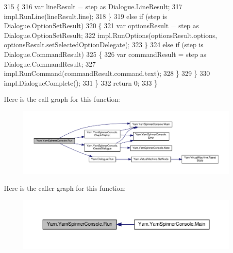 \begin{DoxyCode}
315                     \{
316                         var lineResult = step as Dialogue.LineResult;
317                         impl.RunLine(lineResult.line);
318                     \}
319                     \textcolor{keywordflow}{else} \textcolor{keywordflow}{if} (step is Dialogue.OptionSetResult)
320                     \{
321                         var optionsResult = step as Dialogue.OptionSetResult;
322                         impl.RunOptions(optionsResult.options, optionsResult.setSelectedOptionDelegate);
323                     \}
324                     \textcolor{keywordflow}{else} \textcolor{keywordflow}{if} (step is Dialogue.CommandResult)
325                     \{
326                         var commandResult = step as Dialogue.CommandResult;
327                         impl.RunCommand(commandResult.command.text);
328                     \}
329                 \}
330                 impl.DialogueComplete();
331             \}
332             \textcolor{keywordflow}{return} 0;
333         \}
\end{DoxyCode}


Here is the call graph for this function\-:
\nopagebreak
\begin{figure}[H]
\begin{center}
\leavevmode
\includegraphics[width=350pt]{a00185_a1b974c55540795a9e643c2ec055fbd51_cgraph}
\end{center}
\end{figure}




Here is the caller graph for this function\-:
\nopagebreak
\begin{figure}[H]
\begin{center}
\leavevmode
\includegraphics[width=350pt]{a00185_a1b974c55540795a9e643c2ec055fbd51_icgraph}
\end{center}
\end{figure}


